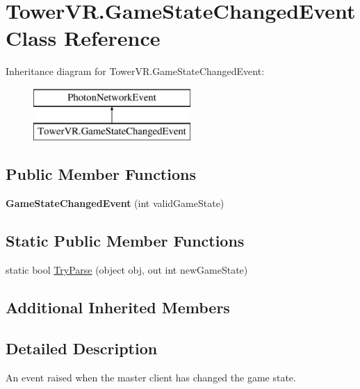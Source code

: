 \hypertarget{class_tower_v_r_1_1_game_state_changed_event}{}\section{Tower\+V\+R.\+Game\+State\+Changed\+Event Class Reference}
\label{class_tower_v_r_1_1_game_state_changed_event}
Inheritance diagram for Tower\+V\+R.\+Game\+State\+Changed\+Event\+:\begin{figure}[H]
\begin{center}
\leavevmode
\includegraphics[height=2.000000cm]{class_tower_v_r_1_1_game_state_changed_event}
\end{center}
\end{figure}
\subsection*{Public Member Functions}
\begin{DoxyCompactItemize}
\item 
{\bfseries Game\+State\+Changed\+Event} (int valid\+Game\+State)\hypertarget{class_tower_v_r_1_1_game_state_changed_event_a6f9283ad204a22cb16636b86503ed856}{}\label{class_tower_v_r_1_1_game_state_changed_event_a6f9283ad204a22cb16636b86503ed856}

\end{DoxyCompactItemize}
\subsection*{Static Public Member Functions}
\begin{DoxyCompactItemize}
\item 
static bool \hyperlink{class_tower_v_r_1_1_game_state_changed_event_af0b026428d28bcfe90b00ea8ba4c9c3c}{Try\+Parse} (object obj, out int new\+Game\+State)
\end{DoxyCompactItemize}
\subsection*{Additional Inherited Members}


\subsection{Detailed Description}
An event raised when the master client has changed the game state. 

